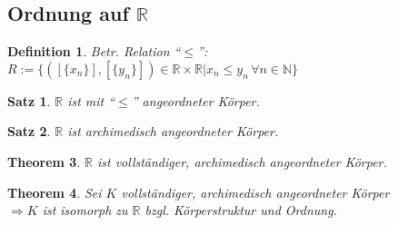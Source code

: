 \documentclass[ngerman,a4paper]{report}
\theoremstyle{break}
\newtheorem{theorem}{Theorem}[section]
\newtheorem{satz}[theorem]{Satz}
\newtheorem*{definition}{Definition}
\begin{document}
\subsection*{Ordnung auf $\mathbb{R}$}
\begin{definition}
	Betr. Relation "`$\le$"': $R:=\{ ([\{x_n\}],[\{y_n\}])\in\mathbb{R}\times\mathbb{R} | x_n \le y_n\,\forall n\in\mathbb{N}\}$
\end{definition}
\begin{satz}
	$\mathbb{R}$ ist mit "`$\le$"' angeordneter Körper.
\end{satz}
\begin{satz}
	$\mathbb{R}$ ist archimedisch angeordneter Körper.
\end{satz}
\begin{theorem}
	$\mathbb{R}$ ist vollständiger, archimedisch angeordneter Körper.
\end{theorem}
\begin{theorem}
	Sei $K$ vollständiger, archimedisch angeordneter Körper\\
	$\Rightarrow K$ ist isomorph zu $\mathbb{R}$ bzgl. Körperstruktur und Ordnung.
\end{theorem}
\end{document}

